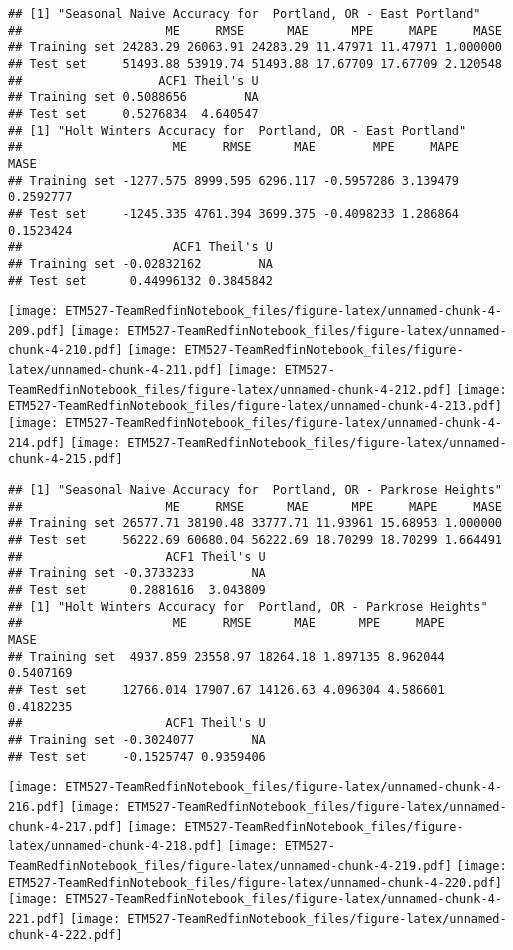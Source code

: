 \documentclass[]{article}
\begin{document}
\begin{verbatim}
## [1] "Seasonal Naive Accuracy for  Portland, OR - East Portland"
##                    ME     RMSE      MAE      MPE     MAPE     MASE
## Training set 24283.29 26063.91 24283.29 11.47971 11.47971 1.000000
## Test set     51493.88 53919.74 51493.88 17.67709 17.67709 2.120548
##                   ACF1 Theil's U
## Training set 0.5088656        NA
## Test set     0.5276834  4.640547
## [1] "Holt Winters Accuracy for  Portland, OR - East Portland"
##                     ME     RMSE      MAE        MPE     MAPE      MASE
## Training set -1277.575 8999.595 6296.117 -0.5957286 3.139479 0.2592777
## Test set     -1245.335 4761.394 3699.375 -0.4098233 1.286864 0.1523424
##                     ACF1 Theil's U
## Training set -0.02832162        NA
## Test set      0.44996132 0.3845842
\end{verbatim}

\texttt{[image: ETM527-TeamRedfinNotebook\_files/figure-latex/unnamed-chunk-4-209.pdf]}
\texttt{[image: ETM527-TeamRedfinNotebook\_files/figure-latex/unnamed-chunk-4-210.pdf]}
\texttt{[image: ETM527-TeamRedfinNotebook\_files/figure-latex/unnamed-chunk-4-211.pdf]}
\texttt{[image: ETM527-TeamRedfinNotebook\_files/figure-latex/unnamed-chunk-4-212.pdf]}
\texttt{[image: ETM527-TeamRedfinNotebook\_files/figure-latex/unnamed-chunk-4-213.pdf]}
\texttt{[image: ETM527-TeamRedfinNotebook\_files/figure-latex/unnamed-chunk-4-214.pdf]}
\texttt{[image: ETM527-TeamRedfinNotebook\_files/figure-latex/unnamed-chunk-4-215.pdf]}

\begin{verbatim}
## [1] "Seasonal Naive Accuracy for  Portland, OR - Parkrose Heights"
##                    ME     RMSE      MAE      MPE     MAPE     MASE
## Training set 26577.71 38190.48 33777.71 11.93961 15.68953 1.000000
## Test set     56222.69 60680.04 56222.69 18.70299 18.70299 1.664491
##                    ACF1 Theil's U
## Training set -0.3733233        NA
## Test set      0.2881616  3.043809
## [1] "Holt Winters Accuracy for  Portland, OR - Parkrose Heights"
##                     ME     RMSE      MAE      MPE     MAPE      MASE
## Training set  4937.859 23558.97 18264.18 1.897135 8.962044 0.5407169
## Test set     12766.014 17907.67 14126.63 4.096304 4.586601 0.4182235
##                    ACF1 Theil's U
## Training set -0.3024077        NA
## Test set     -0.1525747 0.9359406
\end{verbatim}

\texttt{[image: ETM527-TeamRedfinNotebook\_files/figure-latex/unnamed-chunk-4-216.pdf]}
\texttt{[image: ETM527-TeamRedfinNotebook\_files/figure-latex/unnamed-chunk-4-217.pdf]}
\texttt{[image: ETM527-TeamRedfinNotebook\_files/figure-latex/unnamed-chunk-4-218.pdf]}
\texttt{[image: ETM527-TeamRedfinNotebook\_files/figure-latex/unnamed-chunk-4-219.pdf]}
\texttt{[image: ETM527-TeamRedfinNotebook\_files/figure-latex/unnamed-chunk-4-220.pdf]}
\texttt{[image: ETM527-TeamRedfinNotebook\_files/figure-latex/unnamed-chunk-4-221.pdf]}
\texttt{[image: ETM527-TeamRedfinNotebook\_files/figure-latex/unnamed-chunk-4-222.pdf]}
\end{document}
